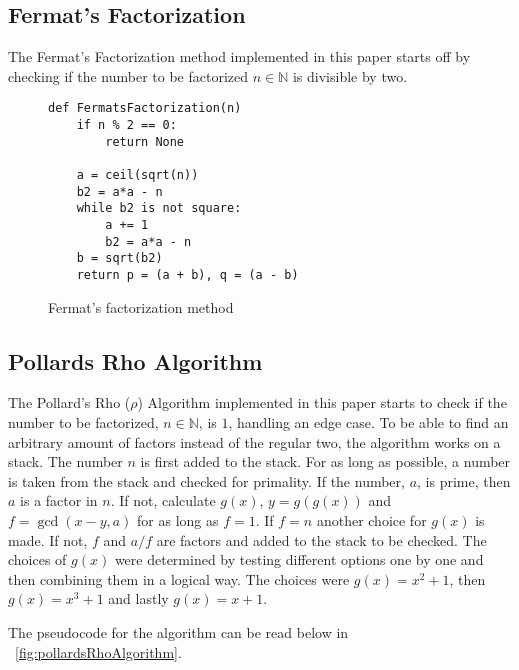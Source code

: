 \subsection{Fermat's Factorization}

The Fermat's Factorization method implemented in this paper starts off by checking if the number to be factorized $n\in\mathbb{N}$ is divisible by two.

 \begin{figure}[H]
    \centering
    \begin{minipage}{0.5\textwidth}
        \begin{verbatim}
def FermatsFactorization(n)
    if n % 2 == 0:
        return None
        
    a = ceil(sqrt(n))
    b2 = a*a - n
    while b2 is not square:
        a += 1
        b2 = a*a - n
    b = sqrt(b2)
    return p = (a + b), q = (a - b)
        \end{verbatim}
    \end{minipage}
    \caption{Fermat's factorization method}
    \label{fig:FermatsFactorization}      
 \end{figure}
\subsection{Pollards Rho Algorithm}

The Pollard's Rho ($\rho$) Algorithm implemented in this paper starts to check if the number to be factorized, $n\in\mathbb{N}$, is $1$, handling an edge case. To be able to find an arbitrary amount of factors instead of the regular two, the algorithm works on a stack. The number $n$ is first added to the stack. For as long as possible, a number is taken from the stack and checked for primality. If the number, $a$, is prime, then $a$ is a factor in $n$. If not, calculate $g(x)$, $y=g(g(x))$ and $f=\gcd(x - y, a)$ for as long as $f=1$. If $f=n$ another choice for $g(x)$ is made. If not, $f$ and $a/f$ are factors and added to the stack to be checked. The choices of $g(x)$ were determined by testing different options one by one and then combining them in a logical way. The choices were $g(x)=x^2+1$, then $g(x)=x^3+1$ and lastly $g(x)=x+1$.

The pseudocode for the algorithm can be read below in ~\ref{fig:pollardsRhoAlgorithm}.
 
